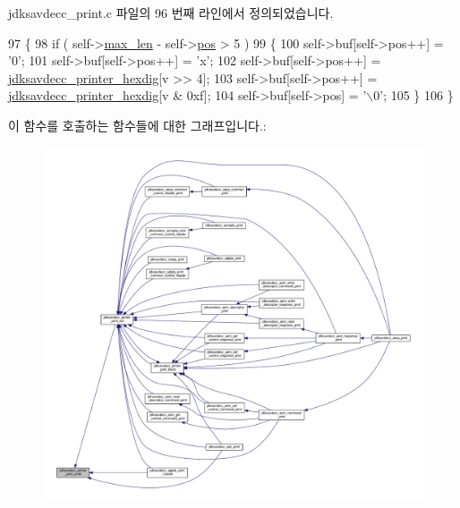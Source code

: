 jdksavdecc\+\_\+print.\+c 파일의 96 번째 라인에서 정의되었습니다.


\begin{DoxyCode}
97 \{
98     \textcolor{keywordflow}{if} ( self->\hyperlink{structjdksavdecc__printer_a956cb5a3c4322e6d67c2f2b21077716c}{max\_len} - self->\hyperlink{structjdksavdecc__printer_a5438a597ee291f523ae04a9fe355924f}{pos} > 5 )
99     \{
100         \textcolor{keyword}{self}->buf[\textcolor{keyword}{self}->pos++] = \textcolor{charliteral}{'0'};
101         \textcolor{keyword}{self}->buf[\textcolor{keyword}{self}->pos++] = \textcolor{charliteral}{'x'};
102         \textcolor{keyword}{self}->buf[\textcolor{keyword}{self}->pos++] = \hyperlink{jdksavdecc__print_8c_ad23c15dfac839a83ff16748e1737ba80}{jdksavdecc\_printer\_hexdig}[v >> 4];
103         \textcolor{keyword}{self}->buf[\textcolor{keyword}{self}->pos++] = \hyperlink{jdksavdecc__print_8c_ad23c15dfac839a83ff16748e1737ba80}{jdksavdecc\_printer\_hexdig}[v & 0xf];
104         \textcolor{keyword}{self}->buf[\textcolor{keyword}{self}->pos] = \textcolor{charliteral}{'\(\backslash\)0'};
105     \}
106 \}
\end{DoxyCode}


이 함수를 호출하는 함수들에 대한 그래프입니다.\+:
\nopagebreak
\begin{figure}[H]
\begin{center}
\leavevmode
\includegraphics[width=350pt]{group__util_ga00205f7730fc39a5b93655a3b18a8dc7_icgraph}
\end{center}
\end{figure}


